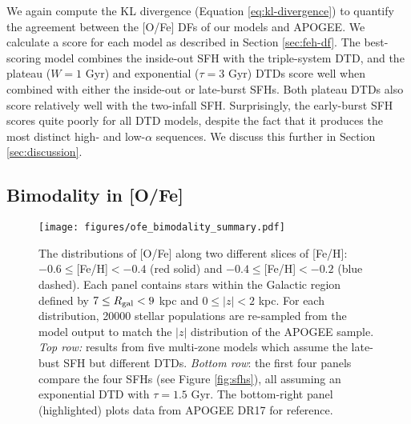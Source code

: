\documentclass[twocolumn,twocolappendix,linenumbers]{aastex631}
\newcommand{\todo}[1]{{\color{red}#1}}
\begin{document}
We again compute the KL divergence (Equation \ref{eq:kl-divergence}) to quantify the agreement between the [O/Fe] DFs of our models and APOGEE. We calculate a score for each model as described in Section \ref{sec:feh-df}. 
The best-scoring model combines the inside-out SFH with the triple-system DTD, and the plateau ($W=1$ Gyr) and exponential ($\tau=3$ Gyr) DTDs score well when combined with either the inside-out or late-burst SFHs. Both plateau DTDs also score relatively well with the two-infall SFH. Surprisingly, the early-burst SFH scores quite poorly for all DTD models, despite the fact that it produces the most distinct high- and low-$\alpha$ sequences. We discuss this further in Section \ref{sec:discussion}.

\subsection{Bimodality in [O/Fe]}
\label{sec:bimodality}

\begin{figure*}
    \centering
    \texttt{[image: figures/ofe\_bimodality\_summary.pdf]}
    \caption{The distributions of [O/Fe] along two different slices of [Fe/H]: $-0.6\leq$[Fe/H]$<-0.4$ (red solid) and $-0.4\leq$[Fe/H]$<-0.2$ (blue dashed). 
    Each panel contains stars within the Galactic region defined by $7\leq R_{\rm gal}<9$ kpc and $0\leq|z|<2$ kpc. 
    For each distribution, \num{20000} stellar populations are re-sampled from the model output to match the $|z|$ distribution of the APOGEE sample.
    \textit{Top row:} results from five multi-zone models which assume the late-bust SFH but different DTDs. \textit{Bottom row}: the first four panels compare the four SFHs (see Figure \ref{fig:sfhs}), all assuming an exponential DTD with $\tau=1.5$ Gyr. The bottom-right panel (highlighted) plots data from APOGEE DR17 for reference.}
    \label{fig:ofe-bimodality}
\end{figure*}
\end{document}
